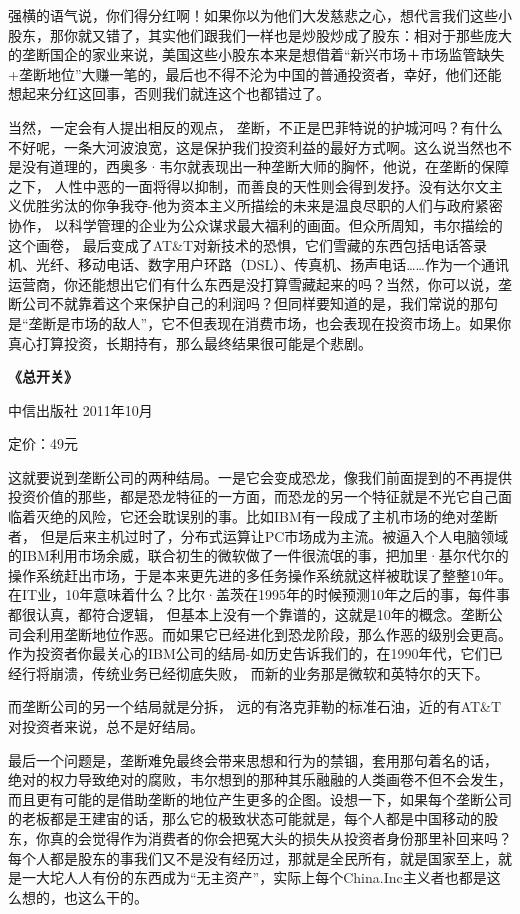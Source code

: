 强横的语气说，你们得分红啊！如果你以为他们大发慈悲之心，想代言我们这些小股东，那你就又错了，其实他们跟我们一样也是炒股炒成了股东：相对于那些庞大的垄断国企的家业来说，美国这些小股东本来是想借着``新兴市场＋市场监管缺失+垄断地位''大赚一笔的，最后也不得不沦为中国的普通投资者，幸好，他们还能想起来分红这回事，否则我们就连这个也都错过了。

当然，一定会有人提出相反的观点，
垄断，不正是巴菲特说的护城河吗？有什么不好呢，一条大河波浪宽，这是保护我们投资利益的最好方式啊。这么说当然也不是没有道理的，西奥多·韦尔就表现出一种垄断大师的胸怀，他说，在垄断的保障之下，
人性中恶的一面将得以抑制，而善良的天性则会得到发抒。没有达尔文主义优胜劣汰的你争我夺-他为资本主义所描绘的未来是温良尽职的人们与政府紧密协作，
以科学管理的企业为公众谋求最大福利的画面。但众所周知，韦尔描绘的这个画卷，
最后变成了AT\&T对新技术的恐惧，它们雪藏的东西包括电话答录机、光纤、移动电话、数字用户环路（DSL）、传真机、扬声电话\ldots\ldots 作为一个通讯运营商，你还能想出它们有什么东西是没打算雪藏起来的吗？当然，你可以说，垄断公司不就靠着这个来保护自己的利润吗？但同样要知道的是，我们常说的那句是``垄断是市场的敌人''，它不但表现在消费市场，也会表现在投资市场上。如果你真心打算投资，长期持有，那么最终结果很可能是个悲剧。

\textbf{《总开关》}

中信出版社 2011年10月

定价：49元

这就要说到垄断公司的两种结局。一是它会变成恐龙，像我们前面提到的不再提供投资价值的那些，都是恐龙特征的一方面，而恐龙的另一个特征就是不光它自己面临着灭绝的风险，它还会耽误别的事。比如IBM有一段成了主机市场的绝对垄断者，
但是后来主机过时了，分布式运算让PC市场成为主流。被逼入个人电脑领域的IBM利用市场余威，联合初生的微软做了一件很流氓的事，把加里·基尔代尔的操作系统赶出市场，于是本来更先进的多任务操作系统就这样被耽误了整整10年。在IT业，10年意味着什么？比尔·盖茨在1995年的时候预测10年之后的事，每件事都很认真，都符合逻辑，
但基本上没有一个靠谱的，这就是10年的概念。垄断公司会利用垄断地位作恶。而如果它已经进化到恐龙阶段，那么作恶的级别会更高。作为投资者你最关心的IBM公司的结局-如历史告诉我们的，在1990年代，它们已经行将崩溃，传统业务已经彻底失败，
而新的业务那是微软和英特尔的天下。

而垄断公司的另一个结局就是分拆， 远的有洛克菲勒的标准石油，近的有AT\&T
对投资者来说，总不是好结局。

最后一个问题是，垄断难免最终会带来思想和行为的禁锢，套用那句着名的话，
绝对的权力导致绝对的腐败，韦尔想到的那种其乐融融的人类画卷不但不会发生，
而且更有可能的是借助垄断的地位产生更多的企图。设想一下，如果每个垄断公司的老板都是王建宙的话，那么它的极致状态可能就是，每个人都是中国移动的股东，你真的会觉得作为消费者的你会把冤大头的损失从投资者身份那里补回来吗？每个人都是股东的事我们又不是没有经历过，那就是全民所有，就是国家至上，就是一大坨人人有份的东西成为``无主资产''，实际上每个China.Inc主义者也都是这么想的，也这么干的。

